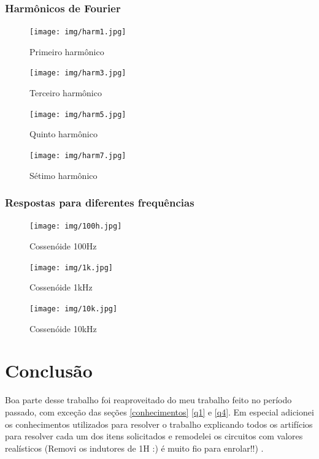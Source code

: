\documentclass[a4paper, 12pt]{article}
\begin{document}
			\subsubsection{Harmônicos de Fourier}
			\begin{figure}[!ht]
				\centering
				\texttt{[image: img/harm1.jpg]}
				\caption{Primeiro harmônico}
			\end{figure}					
			\begin{figure}[!ht]
				\centering
				\texttt{[image: img/harm3.jpg]}
				\caption{Terceiro harmônico}
			\end{figure}					
			\begin{figure}[!ht]
				\centering
				\texttt{[image: img/harm5.jpg]}
				\caption{Quinto harmônico}
			\end{figure}					
			\begin{figure}[!ht]
				\centering
				\texttt{[image: img/harm7.jpg]}
				\caption{Sétimo harmônico}
			\end{figure}		

			\clearpage
			\newpage
			\subsubsection{Respostas para diferentes frequências}
			\begin{figure}[!ht]
				\centering
				\texttt{[image: img/100h.jpg]}
				\caption{Cossenóide 100Hz}
			\end{figure}					
			\begin{figure}[!ht]
				\centering
				\texttt{[image: img/1k.jpg]}
				\caption{Cossenóide 1kHz}
			\end{figure}					
			\begin{figure}[!ht]
				\centering
				\texttt{[image: img/10k.jpg]}
				\caption{Cossenóide 10kHz}
			\end{figure}						
	\newpage
	\section{Conclusão}

	Boa parte desse trabalho foi reaproveitado do meu trabalho feito no período passado, com exceção das seções \ref{conhecimentos} \ref{q1} e \ref{q4}. Em especial adicionei os conhecimentos utilizados para resolver o trabalho explicando todos os artifícios para resolver cada um dos itens solicitados e remodelei os circuitos com valores realísticos (Removi os indutores de 1H :) é muito fio para enrolar!!) .
\end{document}

